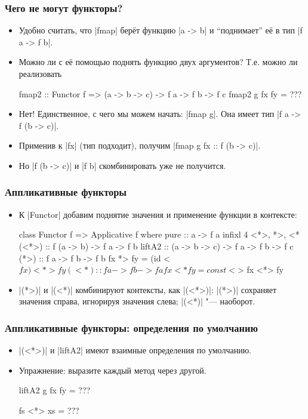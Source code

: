 \documentclass[11pt]{beamer}
\begin{document}
\begin{frame}[fragile]
  \frametitle{Чего не могут функторы?}
  \begin{itemize}
    \item Удобно считать, что \haskinline|fmap| берёт функцию \haskinline|a -> b| и \enquote{поднимает} её в тип \haskinline|f a -> f b|.
    \item Можно ли с её помощью поднять функцию двух аргументов? Т.е. можно ли реализовать
          \begin{haskellsmall}
            fmap2 :: Functor f => (a -> b -> c) ->
              f a -> f b -> f c
            fmap2 g fx fy = ???
          \end{haskellsmall}
          \pause
    \item Нет! Единственное, с чего мы можем начать: \pause \haskinline|fmap g|. Она имеет тип \pause \haskinline|f a -> f (b -> c)|.
    \item Применив к \haskinline|fx| (тип подходит), получим
          \haskinline|fmap g fx :: f (b -> c)|. \pause
    \item Но \haskinline|f (b -> c)| и  \haskinline|f b| скомбинировать уже не получится.
  \end{itemize}
\end{frame}

\begin{frame}[fragile]
  \frametitle{Аппликативные функторы}
  \begin{itemize}
    \item К \haskinline|Functor| добавим поднятие значения и применение функции в контексте:
          \begin{haskellsmall}
            class Functor f => Applicative f where
              pure  :: a -> f a
              infixl 4 <*>, *>, <*
              (<*>) :: f (a -> b) -> f a -> f b
              liftA2 :: (a -> b -> c) ->
                f a -> f b -> f c
              (*>) :: f a -> f b -> f b
              fx *> fy = (id <$ fx) <*> fy
              (<*) :: f a -> f b -> f a
              fx <* fy = const <$> fx <*> fy
          \end{haskellsmall}
    \item \haskinline|(*>)| и \haskinline|(<*)| комбинируют контексты, как \haskinline|(<*>)|: \haskinline|(*>)| сохраняет значения справа, игнорируя значения слева; \haskinline|(<*)| "--- наоборот.
  \end{itemize}
\end{frame}

\begin{frame}[fragile]
  \frametitle{Аппликативные функторы: определения по умолчанию}
  \begin{itemize}
    \item \haskinline|(<*>)| и \haskinline|liftA2| имеют взаимные определения по умолчанию.
    \item Упражнение: выразите каждый метод через другой.
          \begin{haskellsmall}
            liftA2 g fx fy = ???

            fs <*> xs = ???
          \end{haskellsmall}
  \end{itemize}
\end{frame}
\end{document}
